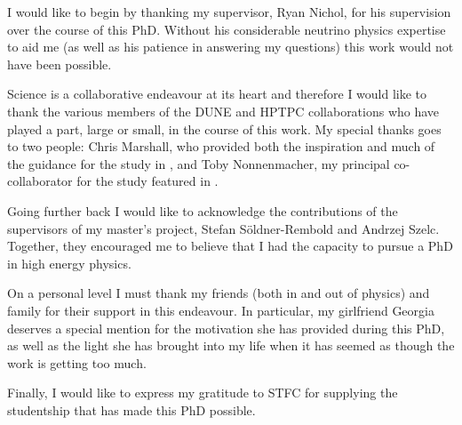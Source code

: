 \begin{acknowledgements}
	
I would like to begin by thanking my supervisor, Ryan Nichol, for his supervision over the course of this PhD. 
Without his considerable neutrino physics expertise to aid me (as well as his patience in answering my questions) this work would not have been possible.

Science is a collaborative endeavour at its heart and therefore I would like to thank the various members of the DUNE and HPTPC collaborations who have played a part, large or small, in the course of this work.
My special thanks goes to two people: Chris Marshall, who provided both the inspiration and much of the guidance for the study in , and Toby Nonnenmacher, my principal co-collaborator for the study featured in .

Going further back I would like to acknowledge the contributions of the supervisors of my master's project, Stefan S\"oldner-Rembold and Andrzej Szelc.
Together, they encouraged me to believe that I had the capacity to pursue a PhD in high energy physics.

On a personal level I must thank my friends (both in and out of physics) and family for their support in this endeavour.
In particular, my girlfriend Georgia deserves a special mention for the motivation she has provided during this PhD, as well as the light she has brought into my life when it has seemed as though the work is getting too much.

Finally, I would like to express my gratitude to STFC for supplying the studentship that has made this PhD possible.

\end{acknowledgements}

\setcounter{tocdepth}{2} 

\tableofcontents
\listoffigures
\listoftables

